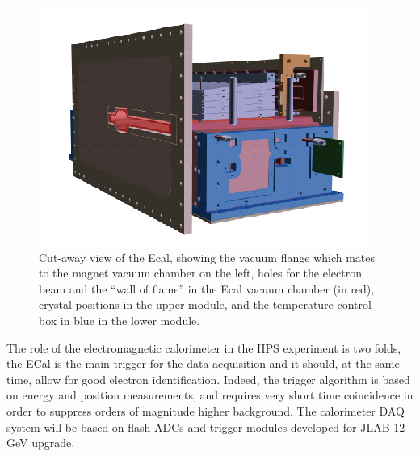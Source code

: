 \begin{figure}[t]
\includegraphics[scale=0.7]{ecal/ECal.png}
\caption{\small{Cut-away view of the Ecal, showing the vacuum flange which mates to the magnet vacuum chamber on the left, holes for the electron beam and the “wall of flame” in the Ecal vacuum chamber (in red), crystal positions in the upper module, and the temperature control box in blue in the lower module.}}\label{fig:ecal}
\end{figure}

The role of the electromagnetic calorimeter in the HPS experiment is two folds, the ECal is the main trigger for the data acquisition and it should, at the same time, allow for good electron identification. Indeed, the trigger algorithm is based on energy and position measurements, and requires very short time coincidence in order to suppress orders of magnitude higher background. The calorimeter DAQ system will be based on flash ADCs and trigger modules developed for JLAB 12 GeV upgrade.

